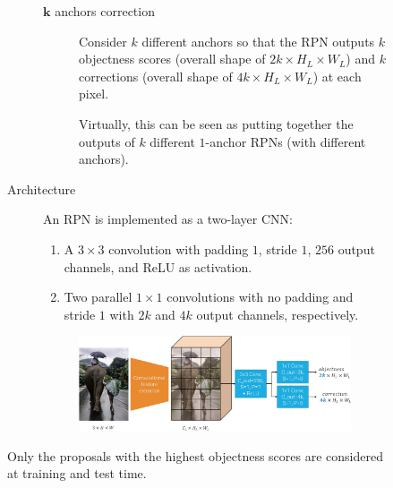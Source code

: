 \begin{description}
\begin{description}
\begin{description}
\begin{description}
                    \item[$\mathbf{k}$ anchors correction] 
                        Consider $k$ different anchors so that the RPN outputs $k$ objectness scores (overall shape of $2k \times H_L \times W_L$) and $k$ corrections (overall shape of $4k \times H_L \times W_L$) at each pixel.

                        \begin{remark}
                            Virtually, this can be seen as putting together the outputs of $k$ different $1$-anchor RPNs (with different anchors).
                        \end{remark}
                \end{description}

                \item[Architecture]
                    An RPN is implemented as a two-layer CNN:
                    \begin{enumerate}
                        \item A $3 \times 3$ convolution with padding $1$, stride $1$, $256$ output channels, and ReLU as activation.
                        \item Two parallel $1 \times 1$ convolutions with no padding and stride $1$ with $2k$ and $4k$ output channels, respectively.
                    \end{enumerate}
                    \begin{figure}[H]
                        \raggedleft
                        \includegraphics[width=0.7\linewidth]{./img/_rpn_architecture.jpg}
                    \end{figure}
            \end{description}

            \begin{remark}
                Only the proposals with the highest objectness scores are considered at training and test time.
            \end{remark}


\end{description}
\end{description}
